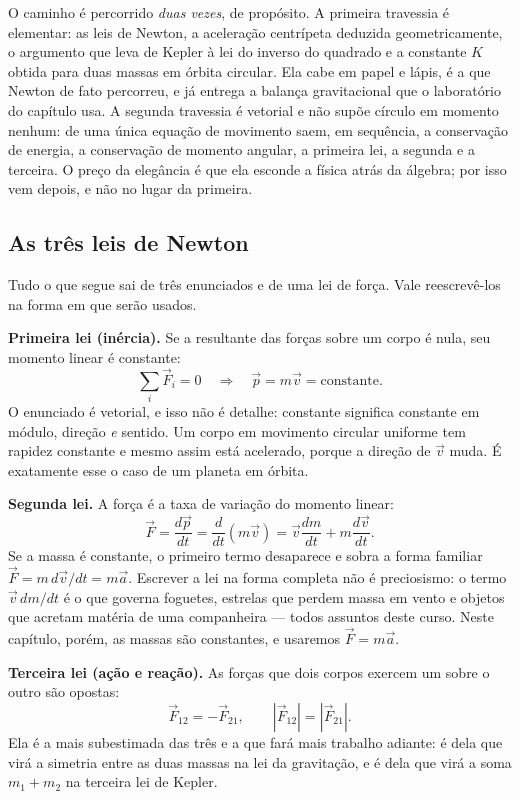 \documentclass[11pt,a4paper]{article}
\begin{document}
O caminho é percorrido \emph{duas vezes}, de propósito. A primeira travessia é elementar: as leis de Newton, a
aceleração centrípeta deduzida geometricamente, o argumento que leva de Kepler à lei do inverso do quadrado e a
constante $K$ obtida para duas massas em órbita circular. Ela cabe em papel e lápis, é a que Newton de fato
percorreu, e já entrega a balança gravitacional que o laboratório do capítulo usa. A segunda travessia é
vetorial e não supõe círculo em momento nenhum: de uma única equação de movimento saem, em sequência, a
conservação de energia, a conservação de momento angular, a primeira lei, a segunda e a terceira. O preço da
elegância é que ela esconde a física atrás da álgebra; por isso vem depois, e não no lugar da primeira.

\subsection*{As três leis de Newton}

Tudo o que segue sai de três enunciados e de uma lei de força. Vale reescrevê-los na forma em que serão usados.

\textbf{Primeira lei (inércia).} Se a resultante das forças sobre um corpo é nula, seu momento linear é constante:
\[
\sum_i\vec{F}_i=0
\quad\Longrightarrow\quad
\vec{p}=m\vec{v}=\text{constante}.
\]
O enunciado é vetorial, e isso não é detalhe: constante significa constante em módulo, direção \emph{e} sentido.
Um corpo em movimento circular uniforme tem rapidez constante e mesmo assim está acelerado, porque a direção de
$\vec{v}$ muda. É exatamente esse o caso de um planeta em órbita.

\textbf{Segunda lei.} A força é a taxa de variação do momento linear:
\[
\vec{F}=\frac{d\vec{p}}{dt}=\frac{d}{dt}\left(m\vec{v}\right)
=\vec{v}\frac{dm}{dt}+m\frac{d\vec{v}}{dt}.
\]
Se a massa é constante, o primeiro termo desaparece e sobra a forma familiar $\vec{F}=m\,d\vec{v}/dt=m\vec{a}$.
Escrever a lei na forma completa não é preciosismo: o termo $\vec{v}\,dm/dt$ é o que governa foguetes, estrelas
que perdem massa em vento e objetos que acretam matéria de uma companheira --- todos assuntos deste curso. Neste
capítulo, porém, as massas são constantes, e usaremos $\vec{F}=m\vec{a}$.

\textbf{Terceira lei (ação e reação).} As forças que dois corpos exercem um sobre o outro são opostas:
\[
\vec{F}_{12}=-\vec{F}_{21},
\qquad
|\vec{F}_{12}|=|\vec{F}_{21}|.
\]
Ela é a mais subestimada das três e a que fará mais trabalho adiante: é dela que virá a simetria entre as duas
massas na lei da gravitação, e é dela que virá a soma $m_1+m_2$ na terceira lei de Kepler.
\end{document}
